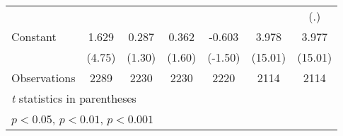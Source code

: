 \begin{table*}[htbp]
\begin{tabular}{l*{6}{c}}
                    &                     &                     &                     &                     &                     &         (.)         \\
[1em]
Constant            &       1.629\sym{***}&       0.287         &       0.362         &      -0.603         &       3.978\sym{***}&       3.977\sym{***}\\
                    &      (4.75)         &      (1.30)         &      (1.60)         &     (-1.50)         &     (15.01)         &     (15.01)         \\
\hline
Observations        &        2289         &        2230         &        2230         &        2220         &        2114         &        2114         \\
\hline\hline
\multicolumn{7}{l}{\footnotesize \textit{t} statistics in parentheses}\\
\multicolumn{7}{l}{\footnotesize \sym{*} \(p<0.05\), \sym{**} \(p<0.01\), \sym{***} \(p<0.001\)}\\
\end{tabular}
\end{table*}
